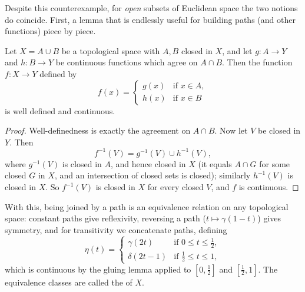 \documentclass[a4paper]{scrartcl}
\begin{document}
Despite this counterexample, for \emph{open} subsets of Euclidean space the two notions do coincide. First, a lemma that is endlessly useful for building paths (and other functions) piece by piece.

\begin{lemma}
    Let $X = A \cup B$ be a topological space with $A, B$ closed in $X$, and let $g: A \rightarrow Y$ and $h: B \rightarrow Y$ be continuous functions which agree on $A \cap B$. Then the function $f: X \rightarrow Y$ defined by
    $$
    f(x) = \begin{cases}
        g(x) &\mbox{if } x \in A, \\
        h(x) &\mbox{if } x \in B
       \end{cases}
    $$
    is well defined and continuous.
\end{lemma}
\begin{proof}
    Well-definedness is exactly the agreement on $A \cap B$. Now let $V$ be closed in $Y$. Then
    $$
    f^{-1}(V) = g^{-1}(V) \cup h^{-1}(V),
    $$
    where $g^{-1}(V)$ is closed in $A$, and hence closed in $X$ (it equals $A \cap G$ for some closed $G$ in $X$, and an intersection of closed sets is closed); similarly $h^{-1}(V)$ is closed in $X$. So $f^{-1}(V)$ is closed in $X$ for every closed $V$, and $f$ is continuous.
\end{proof}

With this, being joined by a path is an equivalence relation on any topological space: constant paths give reflexivity, reversing a path ($t \mapsto \gamma(1 - t)$) gives symmetry, and for transitivity we concatenate paths, defining
$$
\eta(t) = \begin{cases}
    \gamma(2t) &\mbox{if } 0 \leq t \leq \frac{1}{2}, \\
    \delta(2t - 1) &\mbox{if } \frac{1}{2} \leq t \leq 1,
   \end{cases}
$$
which is continuous by the gluing lemma applied to $[0, \frac{1}{2}]$ and $[\frac{1}{2}, 1]$. The equivalence classes are called the  of $X$.
\end{document}
